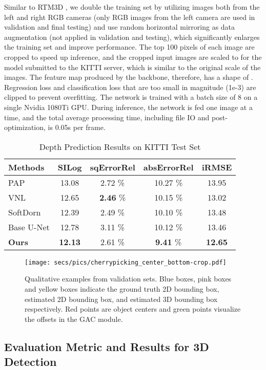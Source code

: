 \documentclass[letterpaper, 10 pt, journal, twoside]{IEEEtran}
\begin{document}
Similar to RTM3D \cite{Li2020RTM3DRM}, we double the training set by utilizing images both from the left and right RGB cameras (only RGB images from the left camera are used in validation and final testing) and use random horizontal mirroring as data augmentation (not applied in validation and testing), which significantly enlarges the training set and improve performance. 
The top 100 pixels of each image are cropped to speed up inference, and the cropped input images are scaled to  for the model submitted to the KITTI server, which is similar to the original scale of the images.
The feature map produced by the backbone, therefore, has a shape of . Regression loss and classification loss that are too small in magnitude (1e-3) are clipped to prevent overfitting.
The network is trained with a batch size of 8 on a single Nvidia 1080Ti GPU.
During inference, the network is fed one image at a time, and the total average processing time, including file IO and post-optimization, is 0.05s per frame.


\begin{table}
    \centering
    \caption{Depth Prediction Results on KITTI Test Set}
    
    \begin{tabular*}{0.48\textwidth}{ l|c|c|c|c }
        \toprule
        {\bf Methods} & {\bf SILog} & {\bf sqErrorRel} & {\bf absErrorRel} & {\bf iRMSE}  \\ 
        \midrule
         
        PAP\cite{PAP2019zhang}          & 13.08 & 2.72 \% & 10.27 \% & 13.95 \\
        VNL\cite{Yin2019VNLNet}         & 12.65 & \textbf{2.46} \% & 10.15 \% & 13.02  \\
        SoftDorn\cite{diaz2019SoftDorn} & 12.39 & 2.49 \% & 10.10 \% & 13.48  \\
        \midrule
        Base U-Net             & 12.78 & 3.11 \% & 10.12 \% & 13.46 \\
        \textbf{Ours}           & \textbf{12.13} & 2.61 \% & \textbf{9.41} \% & \textbf{12.65} \\
        \bottomrule
    \end{tabular*} \label{tab:depth_validation_results}
\end{table} \begin{figure*}
    \centering
\texttt{[image: secs/pics/cherrypicking\_center\_bottom-crop.pdf]}
    \caption{Qualitative examples from validation sets. Blue boxes, pink boxes and yellow boxes indicate the ground truth
    2D bounding box, estimated 2D bounding box, and estimated 3D bounding box respectively. Red points are object centers and green points visualize the offsets  in the GAC module.
    }

    \label{fig:examples}
\end{figure*} \subsection{Evaluation Metric and Results for 3D Detection}
\end{document}
